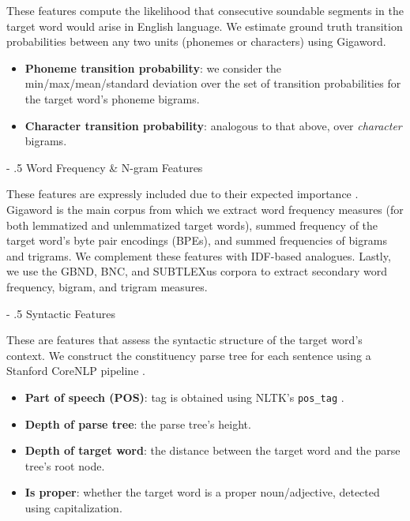 \documentclass[11pt,a4paper]{article}
\makeatletter
\renewcommand\paragraph{%
    \@startsection{paragraph}{4}{0mm}%
        {-\baselineskip}%
        {.5\baselineskip}%
        {\normalfont\normalsize\bfseries}}
\makeatother
\begin{document}
These features compute the likelihood that consecutive soundable segments in the target word would arise in English language. We estimate ground truth transition probabilities between any two units (phonemes or characters) using Gigaword. 

\begin{itemize}
  \item \textbf{Phoneme transition probability}: we consider the min/max/mean/standard deviation over the set of transition probabilities for the target word's phoneme bigrams.
  \item \textbf{Character transition probability}: analogous to that above, over \textit{character} bigrams.
\end{itemize}

\paragraph{Word Frequency \& N-gram Features}

These features are expressly included due to their expected importance \citep{zampieri2017complex}. Gigaword is the main corpus from which we extract word frequency measures (for both lemmatized and unlemmatized target words), summed frequency of the target word's byte pair encodings (BPEs), and summed frequencies of bigrams and trigrams. We complement these features with IDF-based analogues. Lastly, we use the GBND, BNC, and SUBTLEXus corpora to extract secondary word frequency, bigram, and trigram measures. 

\paragraph{Syntactic Features}

These are features that assess the syntactic structure of the target word's context. We construct the constituency parse tree for each sentence using a Stanford CoreNLP pipeline \citep{manning2014stanford}.

\begin{itemize}
  \item \textbf{Part of speech (POS)}: tag is obtained using NLTK's \texttt{pos\_tag} \citep{bird2009natural}.
  \item \textbf{Depth of parse tree}: the parse tree's height.
  \item \textbf{Depth of target word}: the distance between the target word and the parse tree's root node.
  \item \textbf{Is proper}: whether the target word is a proper noun/adjective, detected using capitalization.
\end{itemize}
\end{document}
